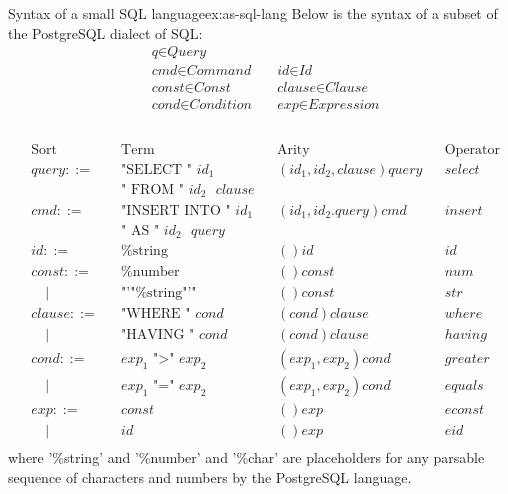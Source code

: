 \begin{example}{Syntax of a small SQL language}{ex:as-sql-lang}
  Below is the syntax of a subset of the PostgreSQL\cite{postgresql-about} dialect of SQL:
  \[
    \begin{aligned}
       & \textit{q} \in \textit{Query}                                                       \\
       & \textit{cmd} \in \textit{Command}      \quad & \textit{id} \in \textit{Id}          \\
       & \textit{const} \in \textit{Const}      \quad & \textit{clause} \in \textit{Clause}  \\
       & \textit{cond} \in \textit{Condition}   \quad & \textit{exp} \in \textit{Expression} \\
    \end{aligned}
  \]
  \\
  \[
    \begin{aligned}
       & \text{Sort} &  & \text{Term}                     &   & \text{Arity}            &  & \text{Operator} \\
       & query ::=   &  & \text{"SELECT " $id_1$}         &   & (id_1,id_2,clause)query &  & select          \\
       &             &  & \text{" FROM " $id_2$ $clause$}                                                    \\
       & cmd ::=     &  & \text{"INSERT INTO " $id_1$}    &   & (id_1,id_2.query)cmd    &  & insert          \\
       &             &  & \text{" AS " $id_2$ $query$}    &                                                  \\
       & id ::=      &  & \text{\%string}                 &   & ()id                    &  & id              \\
       & const ::=   &  & \text{\%number}                 &   & ()const                 &  & num             \\
       & \quad |     &  & \text{"'"\%string"'"}           &   & ()const                 &  & str             \\
       & clause ::=  &  & \text{"WHERE " $cond$}          &   & (cond)clause            &  & where           \\
       & \quad |     &  & \text{"HAVING " $cond$}         &   & (cond)clause            &  & having          \\
       & cond ::=    &  & \text{$exp_1$ ">" $exp_2$}      &   & (exp_1,exp_2)cond       &  & greater         \\
       & \quad |     &  & \text{$exp_1$ "=" $exp_2$}      &   & (exp_1,exp_2)cond       &  & equals          \\
       & exp ::=     &  & \text{$const$}                  &   & ()exp                   &  & econst          \\
       & \quad |     &  & \text{$id$}                     &   & ()exp                   &  & eid             \\
    \end{aligned}
  \]
  where '\%string' and '\%number' and '\%char' are placeholders for any parsable sequence of characters and numbers by the PostgreSQL language.


\end{example}
